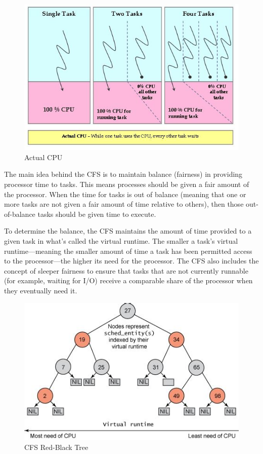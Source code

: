 \documentclass{article}
\begin{document}
\begin{figure}[H]
  \center
  \includegraphics[width=0.7\columnwidth]{./pics/cpu1.jpg}
  \caption{Actual CPU}
  \label{fig:Actual CPU}
\end{figure}

The main idea behind the CFS is to maintain balance (fairness) in providing processor time to tasks. This means processes should be given a fair amount of the processor. When the time for tasks is out of balance (meaning that one or more tasks are not given a fair amount of time relative to others), then those out-of-balance tasks should be given time to execute.

To determine the balance, the CFS maintains the amount of time provided to a given task in what's called the virtual runtime. The smaller a task's virtual runtime—meaning the smaller amount of time a task has been permitted access to the processor—the higher its need for the processor. The CFS also includes the concept of sleeper fairness to ensure that tasks that are not currently runnable (for example, waiting for I/O) receive a comparable share of the processor when they eventually need it.

\begin{figure}[H]
  \center
  \includegraphics[width=\linewidth]{./pics/rbtsched.jpg}
  \caption{CFS Red-Black Tree}
  \label{fig:CFS Red-Black Tree}
\end{figure}
\end{document}

